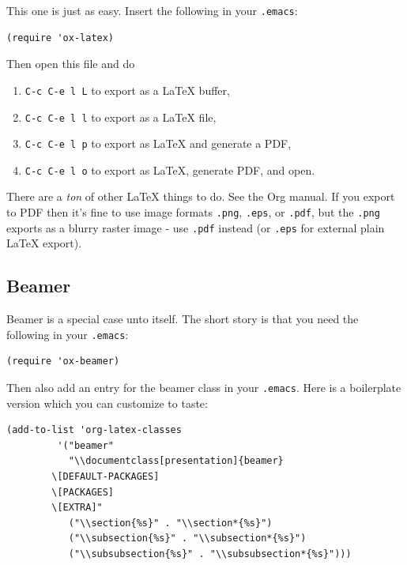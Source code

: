 \documentclass[11pt]{article}
\begin{document}
This one is just as easy.  Insert the following in your \texttt{.emacs}:

\begin{verbatim}
(require 'ox-latex)
\end{verbatim}

Then open this file and do

\begin{enumerate}
\item \texttt{C-c C-e l L} to export as a \LaTeX{} buffer,
\item \texttt{C-c C-e l l} to export as a \LaTeX{} file,
\item \texttt{C-c C-e l p} to export as \LaTeX{} and generate a PDF,
\item \texttt{C-c C-e l o} to export as \LaTeX{}, generate PDF, and open.
\end{enumerate}

There are a \emph{ton} of other \LaTeX{} things to do.  See the Org manual.
If you export to PDF then it's fine to use image formats \texttt{.png},
\texttt{.eps}, or \texttt{.pdf}, but the \texttt{.png} exports as a blurry raster image -
use \texttt{.pdf} instead (or \texttt{.eps} for external plain \LaTeX{} export).
\subsection[Beamer]{Beamer}
\label{sec-4-3}

Beamer is a special case unto itself. The short story is that you need
the following in your \texttt{.emacs}:

\begin{verbatim}
(require 'ox-beamer)
\end{verbatim}

Then also add an entry for the beamer class in your \texttt{.emacs}.  Here is
a boilerplate version which you can customize to taste:

\begin{verbatim}
(add-to-list 'org-latex-classes
	     '("beamer"
	       "\\documentclass[presentation]{beamer}
        \[DEFAULT-PACKAGES]
        \[PACKAGES]
        \[EXTRA]"
	       ("\\section{%s}" . "\\section*{%s}")
	       ("\\subsection{%s}" . "\\subsection*{%s}")
	       ("\\subsubsection{%s}" . "\\subsubsection*{%s}")))
\end{verbatim}
\end{document}
